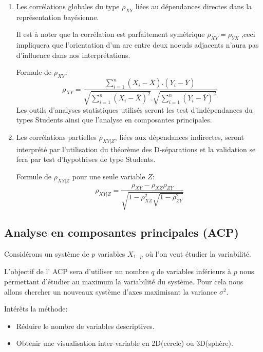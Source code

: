 \documentclass[a4paper]{article}
\begin{document}
\begin{enumerate}
  \item Les corrélations globales du type $\rho_{XY}$ liées  au dépendances  directes dans la représentation bayésienne.

Il est à noter que la corrélation est parfaitement symétrique $\rho_{XY}=\rho_{YX}$ ,ceci impliquera que l'orientation d'un arc entre deux noeuds adjacents n'aura pas d'influence dans nos interprétations.    

Formule de $\rho_{XY}$:
\begin{equation}
\rho_{XY}=\frac{\sum_{i=1}^{n}(X_i-\overline{X}).(Y_i-\overline{Y})}{\sqrt{\sum_{i=1}^{n}(X_i-\overline{X})^{2}} .\sqrt{\sum_{i=1}^{n}(Y_i-\overline{Y})^{2}}}
\end{equation}
Les outils d'analyses statistiques utilisés seront les test d'indépendances du types Students ainsi que l'analyse en composantes principales.



\item Les corrélations partielles $\rho_{XY|Z}$, liées aux dépendances indirectes, seront interprété par l'utilisation du théorème des D-séparations et la validation se fera par test d'hypothèses de  type Students.

Formule de $\rho_{XY|Z}$ pour une seule variable $Z$:
\begin{equation}
\rho_{XY|Z}=\frac{\rho_{XY}-\rho_{XZ}\rho_{ZY}}{\sqrt{1-\rho_{XZ}^{2}\sqrt{1-\rho_{ZY}^{2}}}}
\end{equation}

\end{enumerate}







\newpage
\subsection{Analyse en composantes principales (ACP)}
Considérons  un système de $p$ variables $X_{1...p}$ où l'on veut étudier la variabilité.

L'objectif de l' ACP sera d'utiliser un nombre $q$ de variables inférieurs à $p$ nous permettant d'étudier au maximum la variabilité du système.
Pour cela nous allons chercher un nouveaux système d'axes maximisant la variance $\sigma^{2}$. 

Intérêts la méthode:

\begin{itemize}
  \item Réduire le nombre de variables descriptives.
  \item Obtenir une visualisation inter-variable en  2D(cercle) ou 3D(sphère).

\end{itemize}
\end{document}
